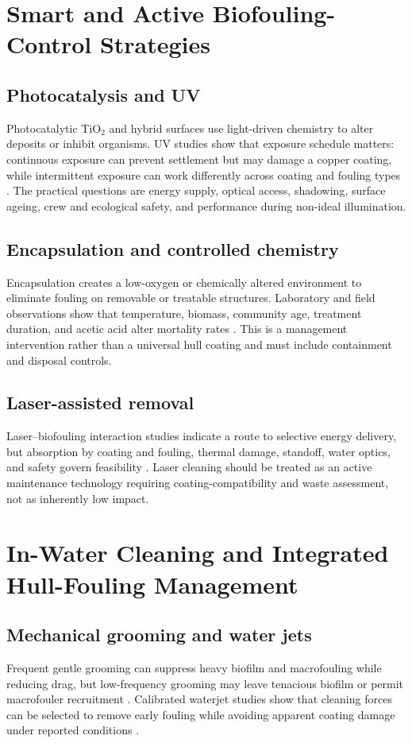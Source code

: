 \section{Smart and Active Biofouling-Control Strategies}
\subsection{Photocatalysis and UV}
Photocatalytic TiO$_2$ and hybrid surfaces use light-driven chemistry to alter deposits or inhibit organisms. UV studies show that exposure schedule matters: continuous exposure can prevent settlement but may damage a copper coating, while intermittent exposure can work differently across coating and fouling types \cite{hunsucker_using_2019}. The practical questions are energy supply, optical access, shadowing, surface ageing, crew and ecological safety, and performance during non-ideal illumination.

\subsection{Encapsulation and controlled chemistry}
Encapsulation creates a low-oxygen or chemically altered environment to eliminate fouling on removable or treatable structures. Laboratory and field observations show that temperature, biomass, community age, treatment duration, and acetic acid alter mortality rates \cite{atalah_its_2016}. This is a management intervention rather than a universal hull coating and must include containment and disposal controls.

\subsection{Laser-assisted removal}
Laser--biofouling interaction studies indicate a route to selective energy delivery, but absorption by coating and fouling, thermal damage, standoff, water optics, and safety govern feasibility \cite{zimbelmann_interaction_2022}. Laser cleaning should be treated as an active maintenance technology requiring coating-compatibility and waste assessment, not as inherently low impact.

\section{In-Water Cleaning and Integrated Hull-Fouling Management}
\subsection{Mechanical grooming and water jets}
Frequent gentle grooming can suppress heavy biofilm and macrofouling while reducing drag, but low-frequency grooming may leave tenacious biofilm or permit macrofouler recruitment \cite{hearin_analysis_2016}. Calibrated waterjet studies show that cleaning forces can be selected to remove early fouling while avoiding apparent coating damage under reported conditions \cite{oliveira_ship_2020}.

